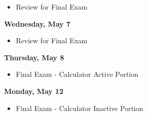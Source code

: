 \documentclass[11pt]{article}
\begin{document}
\begin{itemize}
\item Review for Final Exam
\end{itemize}

\textbf{Wednesday, May 7}

\begin{itemize}
\item Review for Final Exam
\end{itemize}

\textbf{Thursday, May 8}

\begin{itemize}
\item Final Exam - Calculator Active Portion
\end{itemize}

\textbf{Monday, May 12}

\begin{itemize}
\item Final Exam - Calculator Inactive Portion
\end{itemize}
\end{document}

